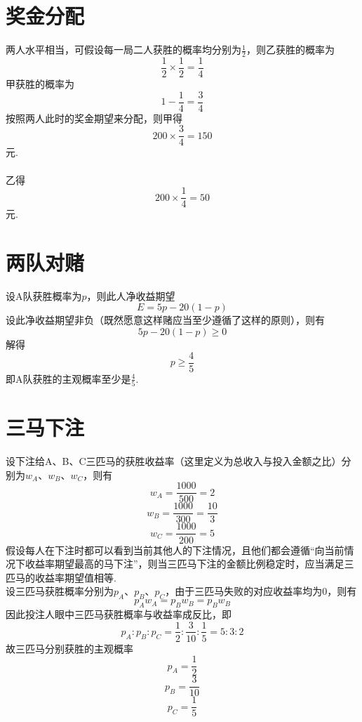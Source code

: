 \documentclass{article}
\begin{document}
\begin{CJK}{UTF8}{gbsn}
\section{奖金分配}
两人水平相当，可假设每一局二人获胜的概率均分别为$\frac{1}{2}$，则乙获胜的概率为
$$ \frac{1}{2} \times \frac{1}{2} = \frac{1}{4} $$
甲获胜的概率为
$$ 1 - \frac{1}{4} = \frac{3}{4} $$
按照两人此时的奖金期望来分配，则甲得
$$ 200\times\frac{3}{4}=150 $$
元.
\\\\
乙得
$$ 200\times\frac{1}{4}=50 $$
元.
\section{两队对赌}
设A队获胜概率为$p$，则此人净收益期望
$$ E=5p-20(1-p) $$
设此净收益期望非负（既然愿意这样赌应当至少遵循了这样的原则），则有
$$ 5p-20(1-p)\geq0$$
解得
$$ p\geq\frac{4}{5} $$
即A队获胜的主观概率至少是$\frac{4}{5}$.
\section{三马下注}
设下注给A、B、C三匹马的获胜收益率（这里定义为总收入与投入金额之比）分别为$w_{A}$、$w_{B}$、$w_{C}$，则有
$$ w_{A}=\frac{1000}{500}=2 $$
$$ w_{B}=\frac{1000}{300}=\frac{10}{3} $$
$$ w_{C}=\frac{1000}{200}=5 $$
假设每人在下注时都可以看到当前其他人的下注情况，且他们都会遵循“向当前情况下收益率期望最高的马下注”，则当三匹马下注的金额比例稳定时，应当满足三匹马的收益率期望值相等.
\\
设三匹马获胜概率分别为$p_{A}$、$p_{B}$、$p_{C}$，由于三匹马失败的对应收益率均为$0$，则有
$$ p_{A}w_{A}=p_{B}w_{B}=p_{B}w_{B} $$
因此投注人眼中三匹马获胜概率与收益率成反比，即
$$ p_{A}:p_{B}:p_{C}=\frac{1}{2}:\frac{3}{10}:\frac{1}{5}=5:3:2 $$
故三匹马分别获胜的主观概率
$$ p_{A}=\frac{1}{2} $$
$$ p_{B}=\frac{3}{10} $$
$$ p_{C}=\frac{1}{5} $$

\end{CJK}
\end{document}
